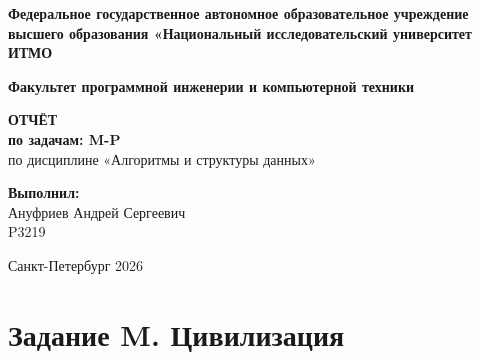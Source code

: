 \documentclass[a4paper,12pt]{article}
\begin{document}
    \begin{titlepage}
        \begin{center}
            \textbf{Федеральное государственное автономное образовательное учреждение высшего образования «Национальный исследовательский университет ИТМО} \\
            \vspace{1cm}

            \textbf{Факультет программной инженерии и компьютерной техники} \\
            \vspace{1cm}

            \Large{\textbf{ОТЧЁТ}} \\
            \Large{\textbf{по задачам: M-P}} \\
            \large{по дисциплине «Алгоритмы и структуры данных»} \\
            \vspace{2cm}
        \end{center}

        \begin{flushright}
            \textbf{Выполнил:} \\
            Ануфриев Андрей Сергеевич \\
            P3219 \\
        \end{flushright}

        \vfill
        \begin{center}
            Санкт-Петербург 2026
        \end{center}
    \end{titlepage}

    \tableofcontents
    \newpage



    \section{Задание M. Цивилизация}

    
\end{document}

